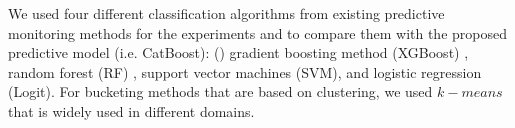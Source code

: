 



We used four different classification algorithms from existing predictive monitoring methods for the experiments and to compare them with the proposed predictive model (i.e. CatBoost): () gradient boosting method (XGBoost) \cite{rozumnyi2017dashboard, senderovich2019knowledge}, random forest (RF) \cite{leontjeva2016complex, cudredata}, support vector machines (SVM), and logistic regression (Logit). For bucketing methods that are based on clustering, we used $k-means$ that is widely used in different domains. 

